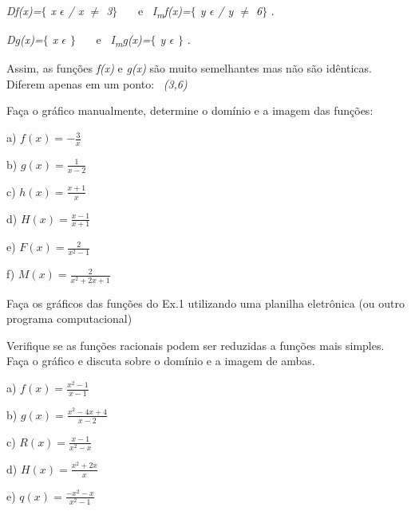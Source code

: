 \begin{texemplo}
\begin{justify}
\quad  \textit{Df(x)=$ \{ $ x $ \epsilon $  \textbf{ }/  x $ \neq $  3$ \} $ }~~~e~  \textit{I\textsubscript{m}f(x)=$ \{ $ y $ \epsilon $   / y $ \neq $   6$ \} $ }.
\end{justify}

\begin{justify}
\textit{\quad Dg(x)=$ \{ $ x $ \epsilon $  $ \} $ }~~~e~  \textit{I\textsubscript{m}g(x)=$ \{ $ y $ \epsilon $  $ \} $ }.
\end{justify}

\quad Assim, as funções \textit{f(x)} e \textit{g(x)} são muito semelhantes mas não são idênticas. Diferem apenas em um ponto:~ \textit{(3,6)}~ \qedsymbol{} 

\end{texemplo}
\newpage
\begin{exercicios}
	\exitem{} Faça o gráfico manualmente, determine o domínio e a imagem das funções:~ 

\begin{multicols}{3}

	a) \( f \left( x \right) =-\frac{3}{x} \)

	b) \( g \left( x \right) =\frac{1}{x-2} \)

	c)  \( h \left( x \right) =\frac{x+1}{x} \)

	d)  \( H \left( x \right) =\frac{x-1}{x+1} \)

	e)  \( F \left( x \right) =\frac{2}{x^{2}-1} \) 

	f)  \( M \left( x \right) =\frac{2}{x^{2}+2x+1} \) 
\end{multicols}

	\exitem{} Faça os gráficos das funções do Ex.1 utilizando uma planilha eletrônica (ou outro programa computacional) 

	\exitem{} Verifique se as funções racionais podem ser reduzidas a funções mais simples. Faça o gráfico e discuta sobre o domínio e a imagem de ambas.

\begin{multicols}{3}
	a) \( f \left( x \right) =\frac{x^{2}-1}{x-1} \)

	b) \( g \left( x \right) =\frac{x^{2}-4x+4}{x-2} \)
	
	c)  \( R \left( x \right) =\frac{x-1}{x^{2}-x} \)

	d)  \( H \left( x \right) =\frac{x^{2}+2x}{x} \)
	
	e) \( q \left( x \right) =\frac{-x^{2}-x}{x^{2}-1} \)


\end{multicols}
\end{exercicios}
